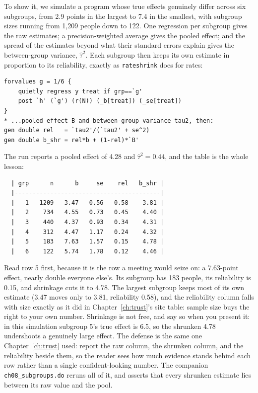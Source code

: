 To show it, we simulate a program whose true effects genuinely differ across six subgroups, from 2.9 points in the largest to 7.4 in the smallest, with subgroup sizes running from 1{,}209 people down to 122. One regression per subgroup gives the raw estimates; a precision-weighted average gives the pooled effect; and the spread of the estimates beyond what their standard errors explain gives the between-group variance, $\hat\tau^2$. Each subgroup then keeps its own estimate in proportion to its reliability, exactly as \texttt{rateshrink} does for rates:
\par
{\footnotesize
\begin{verbatim}
forvalues g = 1/6 {
    quietly regress y treat if grp==`g'
    post `h' (`g') (r(N)) (_b[treat]) (_se[treat])
}
* ...pooled effect B and between-group variance tau2, then:
gen double rel   = `tau2'/(`tau2' + se^2)
gen double b_shr = rel*b + (1-rel)*`B'
\end{verbatim}
}
The run reports a pooled effect of 4.28 and $\hat\tau^2 = 0.44$, and the table is the whole lesson:
\par
{\footnotesize
\begin{verbatim}
  | grp      n      b     se    rel   b_shr |
  |-----------------------------------------|
  |   1   1209   3.47   0.56   0.58    3.81 |
  |   2    734   4.55   0.73   0.45    4.40 |
  |   3    440   4.37   0.93   0.34    4.31 |
  |   4    312   4.47   1.17   0.24    4.32 |
  |   5    183   7.63   1.57   0.15    4.78 |
  |   6    122   5.74   1.78   0.12    4.46 |
\end{verbatim}
}
Read row 5 first, because it is the row a meeting would seize on: a 7.63-point effect, nearly double everyone else's. Its subgroup has 183 people, its reliability is 0.15, and shrinkage cuts it to 4.78. The largest subgroup keeps most of its own estimate (3.47 moves only to 3.81, reliability 0.58), and the reliability column falls with size exactly as it did in Chapter~\ref{ch:trust}'s site table: sample size buys the right to your own number. Shrinkage is not free, and say so when you present it: in this simulation subgroup 5's true effect is 6.5, so the shrunken 4.78 undershoots a genuinely large effect. The defense is the same one Chapter~\ref{ch:trust} used: report the raw column, the shrunken column, and the reliability beside them, so the reader sees how much evidence stands behind each row rather than a single confident-looking number. The companion \texttt{ch08\_subgroups.do} reruns all of it, and asserts that every shrunken estimate lies between its raw value and the pool.


